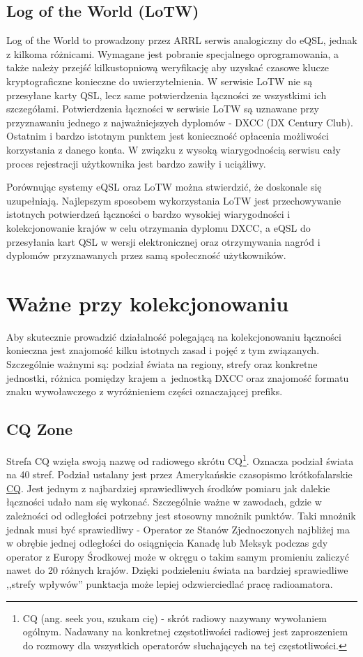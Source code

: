 \documentclass[]{mgr}
\begin{document}
            \subsection{Log of the World (LoTW)}
            Log of the World to prowadzony przez ARRL serwis analogiczny do eQSL, jednak z kilkoma różnicami. Wymagane jest pobranie specjalnego oprogramowania, a także należy przejść kilkustopniową weryfikację aby uzyskać czasowe klucze kryptograficzne konieczne do uwierzytelnienia. W serwisie LoTW nie są przesyłane karty QSL, lecz same potwierdzenia łączności ze wszystkimi ich szczegółami. Potwierdzenia łączności w serwisie LoTW są uznawane przy przyznawaniu jednego z najważniejszych dyplomów - DXCC (DX Century Club). Ostatnim i bardzo istotnym punktem jest konieczność opłacenia możliwości korzystania z danego konta. W związku z wysoką wiarygodnością serwisu cały proces rejestracji użytkownika jest bardzo zawiły i uciążliwy.

            Porównując systemy eQSL oraz LoTW można stwierdzić, że doskonale się uzupełniają. Najlepszym sposobem wykorzystania LoTW jest przechowywanie istotnych potwierdzeń łączności o bardzo wysokiej wiarygodności i kolekcjonowanie krajów w celu otrzymania dyplomu DXCC, a eQSL do przesyłania kart QSL w wersji elektronicznej oraz otrzymywania nagród i dyplomów przyznawanych przez samą społeczność użytkowników.

        \section{Ważne przy kolekcjonowaniu}
        Aby skutecznie prowadzić działalność polegającą na kolekcjonowaniu łączności konieczna jest znajomość kilku istotnych zasad i pojęć z tym związanych. Szczególnie ważnymi są: podział świata na regiony, strefy oraz konkretne jednostki, różnica pomiędzy krajem a~jednostką DXCC oraz znajomość formatu znaku wywoławczego z wyróżnieniem części oznaczającej prefiks.

            \subsection{CQ Zone}
            Strefa CQ wzięła swoją nazwę od radiowego skrótu CQ\footnote{CQ (ang. seek you, szukam cię) - skrót radiowy nazywany wywołaniem ogólnym. Nadawany na konkretnej częstotliwości radiowej jest zaproszeniem do rozmowy dla wszystkich operatorów słuchających na tej częstotliwości.}. Oznacza podział świata na 40 stref. Podział ustalany jest przez Amerykańskie czasopismo krótkofalarskie \underline{CQ}. Jest jednym z najbardziej sprawiedliwych środków pomiaru jak dalekie łączności udało nam się wykonać. Szczególnie ważne w zawodach, gdzie w zależności od odległości potrzebny jest stosowny mnożnik punktów. Taki mnożnik jednak musi być sprawiedliwy - Operator ze Stanów Zjednoczonych najbliżej ma w obrębie jednej odległości do osiągnięcia Kanadę lub Meksyk podczas gdy operator z Europy Środkowej może w okręgu o takim samym promieniu zaliczyć nawet do 20 różnych krajów. Dzięki podzieleniu świata na bardziej sprawiedliwe ,,strefy wpływów'' punktacja może lepiej odzwierciedlać pracę radioamatora.
\end{document}
